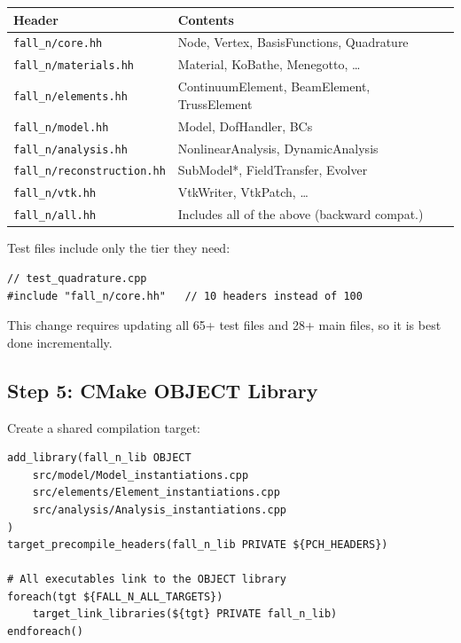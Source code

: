 \begin{center}
  \begin{tabular}{ll}
    \toprule
    \textbf{Header} & \textbf{Contents} \\
    \midrule
    \texttt{fall\_n/core.hh} &
      Node, Vertex, BasisFunctions, Quadrature \\
    \texttt{fall\_n/materials.hh} &
      Material, KoBathe, Menegotto, \ldots \\
    \texttt{fall\_n/elements.hh} &
      ContinuumElement, BeamElement, TrussElement \\
    \texttt{fall\_n/model.hh} &
      Model, DofHandler, BCs \\
    \texttt{fall\_n/analysis.hh} &
      NonlinearAnalysis, DynamicAnalysis \\
    \texttt{fall\_n/reconstruction.hh} &
      SubModel*, FieldTransfer, Evolver \\
    \texttt{fall\_n/vtk.hh} &
      VtkWriter, VtkPatch, \ldots \\
    \texttt{fall\_n/all.hh} &
      Includes all of the above (backward compat.) \\
    \bottomrule
  \end{tabular}
\end{center}

Test files include only the tier they need:
\begin{lstlisting}
// test_quadrature.cpp
#include "fall_n/core.hh"   // 10 headers instead of 100
\end{lstlisting}

This change requires updating all 65+ test files and 28+
main files, so it is best done incrementally.


\subsection{Step 5: CMake OBJECT Library}
\label{sec:build-object-lib}

Create a shared compilation target:

\begin{lstlisting}[caption={CMake OBJECT library.}]
add_library(fall_n_lib OBJECT
    src/model/Model_instantiations.cpp
    src/elements/Element_instantiations.cpp
    src/analysis/Analysis_instantiations.cpp
)
target_precompile_headers(fall_n_lib PRIVATE ${PCH_HEADERS})

# All executables link to the OBJECT library
foreach(tgt ${FALL_N_ALL_TARGETS})
    target_link_libraries(${tgt} PRIVATE fall_n_lib)
endforeach()
\end{lstlisting}

